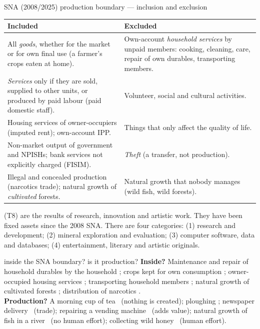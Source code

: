 \begin{keybox}{SNA (2008/2025) production boundary --- inclusion and exclusion}
\small
\begin{tabularx}{\linewidth}{@{}X|X@{}}
\textbf{Included} & \textbf{Excluded} \\ \hline
All \emph{goods}, whether for the market or for own final use (a farmer's crops eaten at home). &
Own-account \emph{household services} by unpaid members: cooking, cleaning, care, repair of own
durables, transporting members. \\
\emph{Services} only if they are sold, supplied to other units, or produced by paid labour (paid
domestic staff). & Volunteer, social and cultural activities. \\
Housing services of owner-occupiers (imputed rent); own-account IPP. & Things that only affect
the quality of life. \\
Non-market output of government and NPISHs; bank services not explicitly charged (FISIM). &
\emph{Theft} (a transfer, not production). \\
Illegal and concealed production (narcotics trade); natural growth of \emph{cultivated} forests. &
Natural growth that nobody manages (wild fish, wild forests). \\
\end{tabularx}
\end{keybox}

 (T8) are the results of research, innovation and artistic
work. They have been fixed assets since the 2008 SNA. There are four categories: (1) research
and development; (2) mineral exploration and evaluation; (3) computer software, data and
databases; (4) entertainment, literary and artistic originals.

\begin{quick}{inside the SNA boundary? is it production?}
\small \textbf{Inside?} Maintenance and repair of household durables by the household \no; crops
kept for own consumption \yes; owner-occupied housing services \yes; transporting household
members \no; natural growth of cultivated forests \yes; distribution of narcotics \yes.\\
\textbf{Production?} A morning cup of tea \no\ (nothing is created); ploughing \yes; newspaper
delivery \yes\ (trade); repairing a vending machine \yes\ (adds value); natural growth of fish in
a river \no\ (no human effort); collecting wild honey \yes\ (human effort).
\end{quick}

